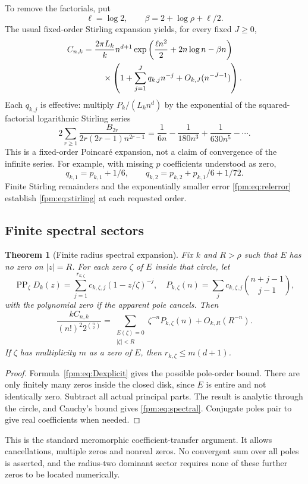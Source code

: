 \documentclass[11pt]{article}
\newtheorem{theorem}{Theorem}[section]
\theoremstyle{definition}\newtheorem{definition}[theorem]{Definition}
\theoremstyle{remark}\newtheorem{remark}[theorem]{Remark}
\begin{document}
To remove the factorials, put
\begin{equation}\label{fpm:eq:ellbeta}
 \ell=\log2,\qquad \beta=2+\log\rho+\ell/2.
\end{equation}
The usual fixed-order Stirling expansion yields, for every fixed $J\ge0$,
\begin{align}
 C_{n,k}={}&\frac{2\pi L_k}{k}n^{d+1}
 \exp\left(\frac{\ell n^2}{2}+2n\log n-\beta n\right)\notag\\
 &\quad\times\left(1+\sum_{j=1}^Jq_{k,j}n^{-j}
 +O_{k,J}(n^{-J-1})\right).\label{fpm:eq:stirling}
\end{align}
Each $q_{k,j}$ is effective: multiply $P_k/(L_kn^d)$ by the exponential of the squared-factorial logarithmic Stirling series
\begin{equation}\label{fpm:eq:stirlseries}
 2\sum_{r\ge1}\frac{B_{2r}}{2r(2r-1)n^{2r-1}}
 =\frac1{6n}-\frac1{180n^3}+\frac1{630n^5}-\cdots.
\end{equation}
This is a fixed-order Poincar\'e expansion, not a claim of convergence of the infinite series. For example, with missing $p$ coefficients understood as zero,
\[
 q_{k,1}=p_{k,1}+1/6,\qquad
 q_{k,2}=p_{k,2}+p_{k,1}/6+1/72.
\]
Finite Stirling remainders and the exponentially smaller error \eqref{fpm:eq:relerror} establish \eqref{fpm:eq:stirling} at each requested order.

\subsection{Finite spectral sectors}
\begin{theorem}[Finite radius spectral expansion]\label{fpm:thm:spectral}
Fix $k$ and $R>\rho$ such that $E$ has no zero on $|z|=R$. For each zero $\zeta$ of $E$ inside that circle, let
\[
 \operatorname{PP}_{\zeta}D_k(z)
 =\sum_{j=1}^{r_{k,\zeta}}c_{k,\zeta,j}(1-z/\zeta)^{-j},
 \quad
 P_{k,\zeta}(n)=\sum_jc_{k,\zeta,j}\binom{n+j-1}{j-1},
\]
with the polynomial zero if the apparent pole cancels. Then
\begin{equation}\label{fpm:eq:spectral}
 \frac{kC_{n,k}}{(n!)^2 2^{\binom n2}}
 =\sum_{\substack{E(\zeta)=0\\|\zeta|<R}}\zeta^{-n}P_{k,\zeta}(n)
 +O_{k,R}(R^{-n}).
\end{equation}
If $\zeta$ has multiplicity $m$ as a zero of $E$, then $r_{k,\zeta}\le m(d+1)$.
\end{theorem}
\begin{proof}
Formula~\eqref{fpm:eq:Dexplicit} gives the possible pole-order bound. There are only finitely many zeros inside the closed disk, since $E$ is entire and not identically zero. Subtract all actual principal parts. The result is analytic through the circle, and Cauchy's bound gives \eqref{fpm:eq:spectral}. Conjugate poles pair to give real coefficients when needed.
\end{proof}
This is the standard meromorphic coefficient-transfer argument. It allows cancellations, multiple zeros and nonreal zeros. No convergent sum over all poles is asserted, and the radius-two dominant sector requires none of these further zeros to be located numerically.
\end{document}
